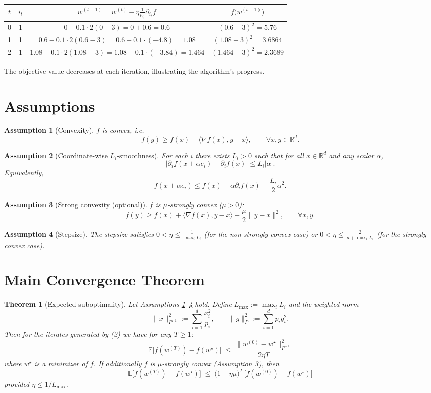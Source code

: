 \documentclass{article}
\newtheorem{theorem}{Theorem}
\newtheorem{assumption}{Assumption}
\newcommand{\E}{\mathbb{E}}
\newcommand{\R}{\mathbb{R}}
\newcommand{\ip}[2]{\langle #1,#2\rangle}
\begin{document}
\begin{tabular}{c|c|c|c}
$t$ & $i_t$ & $w^{(t+1)}=w^{(t)}-\eta\frac{1}{p_{i_t}}\partial_{i_t}f$ & $f\!\bigl(w^{(t+1)}\bigr)$\\\hline
0 & 1 & $0-0.1\cdot 2(0-3)=0+0.6=0.6$ & $(0.6-3)^2=5.76$\\
1 & 1 & $0.6-0.1\cdot 2(0.6-3)=0.6-0.1\cdot(-4.8)=1.08$ & $(1.08-3)^2=3.6864$\\
2 & 1 & $1.08-0.1\cdot 2(1.08-3)=1.08-0.1\cdot(-3.84)=1.464$ & $(1.464-3)^2=2.3689$
\end{tabular}

The objective value decreases at each iteration, illustrating the algorithm’s progress.

\newpage
\section*{Assumptions}
\begin{assumption}[Convexity]\label{as:convex}
$f$ is convex, i.e.
\[
f(y)\ge f(x)+\ip{\nabla f(x)}{y-x},\qquad \forall x,y\in\R^{d}.
\]
\end{assumption}
\begin{assumption}[Coordinate-wise $L_i$‑smoothness]\label{as:smooth}
For each $i$ there exists $L_i>0$ such that for all $x\in\R^{d}$ and any scalar $\alpha$,
\[
\bigl|\partial_i f(x+\alpha e_i)-\partial_i f(x)\bigr|\le L_i|\alpha|.
\]
Equivalently,
\[
f(x+\alpha e_i)\le f(x)+\alpha\partial_i f(x)+\frac{L_i}{2}\alpha^{2}.
\tag{4}
\]
\end{assumption}
\begin{assumption}[Strong convexity (optional)]\label{as:strong}
$f$ is $\mu$‑strongly convex ($\mu>0$):
\[
f(y)\ge f(x)+\ip{\nabla f(x)}{y-x}+\frac{\mu}{2}\|y-x\|^{2},\qquad\forall x,y.
\]
\end{assumption}
\begin{assumption}[Stepsize]\label{as:step}
The stepsize satisfies $0<\eta\le \frac{1}{\max_i L_i}$ (for the non‑strongly‑convex case) or
$0<\eta\le \frac{2}{\mu+\max_i L_i}$ (for the strongly convex case).
\end{assumption}

\section*{Main Convergence Theorem}
\begin{theorem}[Expected suboptimality]\label{thm:conv}
Let Assumptions \ref{as:convex}–\ref{as:step} hold.
Define $L_{\max}:=\max_i L_i$ and the weighted norm
\[
\|x\|_{P^{-1}}^{2}:=\sum_{i=1}^{d}\frac{x_i^{2}}{p_i},
\qquad 
\|g\|_{P}^{2}:=\sum_{i=1}^{d}p_i g_i^{2}.
\]
Then for the iterates generated by (2) we have for any $T\ge1$:
\[
\boxed{\;
\E\!\bigl[f(w^{(T)})-f(w^{\star})\bigr]
\;\le\;
\frac{\|w^{(0)}-w^{\star}\|_{P^{-1}}^{2}}{2\eta T}
\;}
\tag{5}
\]
where $w^{\star}$ is a minimizer of $f$.
If additionally $f$ is $\mu$‑strongly convex (Assumption \ref{as:strong}), then
\[
\boxed{\;
\E\!\bigl[f(w^{(T)})-f(w^{\star})\bigr]
\;\le\;
\bigl(1-\eta\mu\bigr)^{T}\,\bigl[f(w^{(0)})-f(w^{\star})\bigr]
\;}
\tag{6}
\]
provided $\eta\le 1/L_{\max}$.
\end{theorem}
\end{document}
